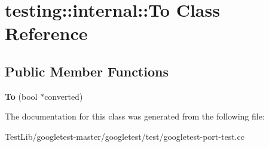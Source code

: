\hypertarget{classtesting_1_1internal_1_1To}{}\section{testing\+:\+:internal\+:\+:To Class Reference}
\label{classtesting_1_1internal_1_1To}
\subsection*{Public Member Functions}
\begin{DoxyCompactItemize}
\item 
\mbox{\label{classtesting_1_1internal_1_1To_a447354e55d855ed0f1a1de8b2b54d345}} 
{\bfseries To} (bool $\ast$converted)
\end{DoxyCompactItemize}


The documentation for this class was generated from the following file\+:\begin{DoxyCompactItemize}
\item 
Test\+Lib/googletest-\/master/googletest/test/googletest-\/port-\/test.\+cc\end{DoxyCompactItemize}

